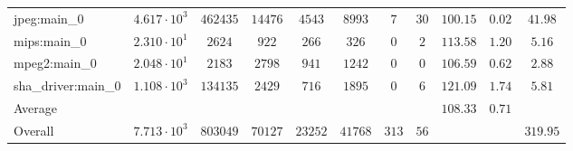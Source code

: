 \begin{tabular}{|l|c|c|c|c|c|c|c|c|c|c|}
jpeg:main\_0            & $ 4.617 \cdot 10^{3}  $ & $ 462435 $ & $ 14476 $ & $ 4543  $ & $ 8993  $ & $ 7   $ & $ 30 $ & $ 100.15      $ & $ 0.02    $ & $ 41.98   $ \\
mips:main\_0            & $ 2.310 \cdot 10^{1}  $ & $ 2624   $ & $ 922   $ & $ 266   $ & $ 326   $ & $ 0   $ & $ 2  $ & $ 113.58      $ & $ 1.20    $ & $ 5.16    $ \\
mpeg2:main\_0           & $ 2.048 \cdot 10^{1}  $ & $ 2183   $ & $ 2798  $ & $ 941   $ & $ 1242  $ & $ 0   $ & $ 0  $ & $ 106.59      $ & $ 0.62    $ & $ 2.88    $ \\
sha\_driver:main\_0     & $ 1.108 \cdot 10^{3}  $ & $ 134135 $ & $ 2429  $ & $ 716   $ & $ 1895  $ & $ 0   $ & $ 6  $ & $ 121.09      $ & $ 1.74    $ & $ 5.81    $ \\
\hline
Average                 & $                     $ & $        $ & $       $ & $       $ & $       $ & $     $ & $    $ & $ 108.33      $ & $ 0.71    $ & $         $ \\
\hline
Overall                 & $ 7.713 \cdot 10^{3}  $ & $ 803049 $ & $ 70127 $ & $ 23252 $ & $ 41768 $ & $ 313 $ & $ 56 $ & $             $ & $         $ & $ 319.95  $ \\
\hline
\end{tabular}
